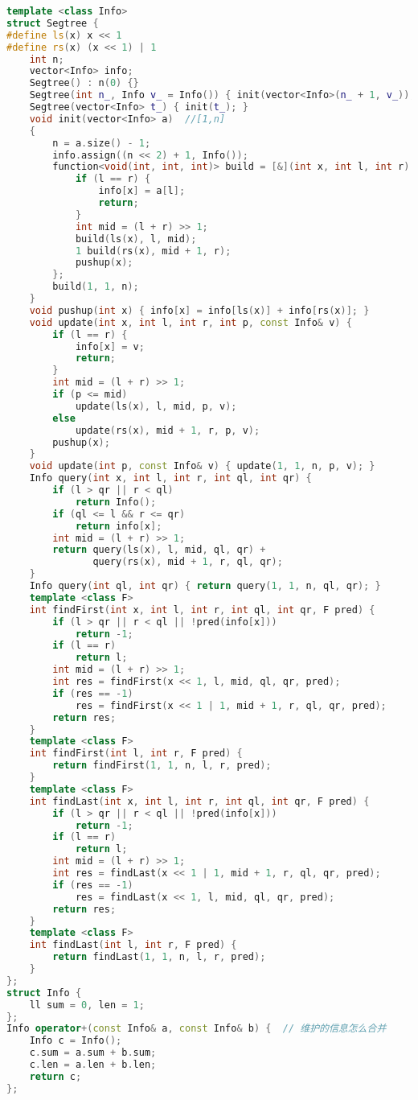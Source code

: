\begin{lstlisting}[language=C++]
template <class Info>
struct Segtree {
#define ls(x) x << 1
#define rs(x) (x << 1) | 1
    int n;
    vector<Info> info;
    Segtree() : n(0) {}
    Segtree(int n_, Info v_ = Info()) { init(vector<Info>(n_ + 1, v_)); }
    Segtree(vector<Info> t_) { init(t_); }
    void init(vector<Info> a)  //[1,n]
    {
        n = a.size() - 1;
        info.assign((n << 2) + 1, Info());
        function<void(int, int, int)> build = [&](int x, int l, int r) -> void {
            if (l == r) {
                info[x] = a[l];
                return;
            }
            int mid = (l + r) >> 1;
            build(ls(x), l, mid);
            1 build(rs(x), mid + 1, r);
            pushup(x);
        };
        build(1, 1, n);
    }
    void pushup(int x) { info[x] = info[ls(x)] + info[rs(x)]; }
    void update(int x, int l, int r, int p, const Info& v) {
        if (l == r) {
            info[x] = v;
            return;
        }
        int mid = (l + r) >> 1;
        if (p <= mid)
            update(ls(x), l, mid, p, v);
        else
            update(rs(x), mid + 1, r, p, v);
        pushup(x);
    }
    void update(int p, const Info& v) { update(1, 1, n, p, v); }
    Info query(int x, int l, int r, int ql, int qr) {
        if (l > qr || r < ql)
            return Info();
        if (ql <= l && r <= qr)
            return info[x];
        int mid = (l + r) >> 1;
        return query(ls(x), l, mid, ql, qr) +
               query(rs(x), mid + 1, r, ql, qr);
    }
    Info query(int ql, int qr) { return query(1, 1, n, ql, qr); }
    template <class F>
    int findFirst(int x, int l, int r, int ql, int qr, F pred) {
        if (l > qr || r < ql || !pred(info[x]))
            return -1;
        if (l == r)
            return l;
        int mid = (l + r) >> 1;
        int res = findFirst(x << 1, l, mid, ql, qr, pred);
        if (res == -1)
            res = findFirst(x << 1 | 1, mid + 1, r, ql, qr, pred);
        return res;
    }
    template <class F>
    int findFirst(int l, int r, F pred) {
        return findFirst(1, 1, n, l, r, pred);
    }
    template <class F>
    int findLast(int x, int l, int r, int ql, int qr, F pred) {
        if (l > qr || r < ql || !pred(info[x]))
            return -1;
        if (l == r)
            return l;
        int mid = (l + r) >> 1;
        int res = findLast(x << 1 | 1, mid + 1, r, ql, qr, pred);
        if (res == -1)
            res = findLast(x << 1, l, mid, ql, qr, pred);
        return res;
    }
    template <class F>
    int findLast(int l, int r, F pred) {
        return findLast(1, 1, n, l, r, pred);
    }
};
struct Info {
    ll sum = 0, len = 1;
};
Info operator+(const Info& a, const Info& b) {  // 维护的信息怎么合并
    Info c = Info();
    c.sum = a.sum + b.sum;
    c.len = a.len + b.len;
    return c;
};
\end{lstlisting}
